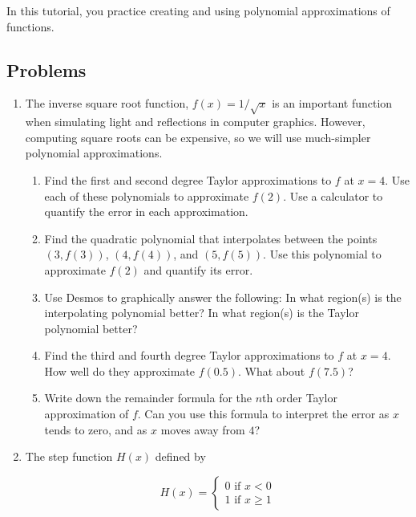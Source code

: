 		\begin{objectives}
			In this tutorial, you practice creating and using polynomial approximations of functions.
		\end{objectives}



		\subsection*{Problems}
		
		\begin{enumerate}
			\item  The inverse square root function, $f(x) = 1/\sqrt{x}$ is an important function
			when simulating light and reflections in computer graphics.  However, computing square 
			roots can be expensive, so we will use much-simpler polynomial approximations.
				\begin{enumerate}
					\item Find the first and second degree Taylor approximations to $f$ at $x=4$.
					Use each of these polynomials to approximate $f(2)$. Use a calculator 
					to quantify the error in each approximation.
					\item Find the quadratic polynomial that interpolates between the points 
					$(3,f(3))$, $(4,f(4))$, and $(5,f(5))$. 
					Use this polynomial to approximate $f(2)$ and quantify its error.

					\item Use Desmos to graphically answer the following: 
					In what region(s) is the interpolating polynomial better?
					In what region(s) is the Taylor polynomial better?

					\item Find the third and fourth degree Taylor approximations to $f$ at $x=4$.
					How well do they approximate $f(0.5)$. What about $f(7.5)$?

					\item Write down the remainder formula for the $n$th order 
                    Taylor approximation of $f$. Can you use this formula to interpret the error as $x$ tends to zero, and as $x$ moves away from $4$?
				\end{enumerate}

				\item The step function $H(x)$  defined by 
                
                \[H(x) = \begin{cases}
				    0  \text{ if } x < 0\\
                        1 \text { if } x \geq 1
				\end{cases}\] 
                

\end{enumerate}
